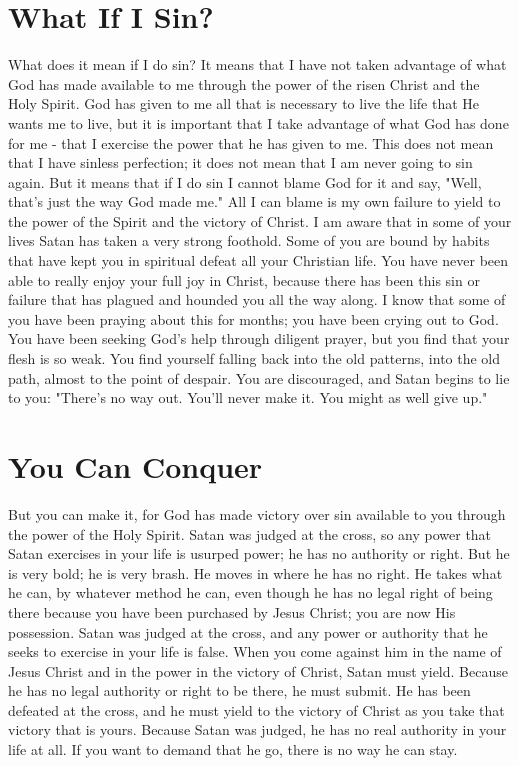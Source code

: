 \section*{What If I Sin?}

What does it mean if I do sin? It means that I have not taken advantage of what God has made available to me through the power of the risen Christ and the Holy Spirit. God has given to me all that is necessary to live the life that He wants me to live, but it is important that I take advantage of what God has done for me - that I exercise the power that he has given to me. This does not mean that I have sinless perfection; it does not mean that I am never going to sin again. But it means that if I do sin I cannot blame God for it and say, "Well, that's just the way God made me." All I can blame is my own failure to yield to the power of the Spirit and the victory of Christ. I am aware that in some of your lives Satan has taken a very strong foothold. Some of you are bound by habits that have kept you in spiritual defeat all your Christian life. You have never been able to really enjoy your full joy in Christ, because there has been this sin or failure that has plagued and hounded you all the way along. I know that some of you have been praying about this for months; you have been crying out to God. You have been seeking God's help through diligent prayer, but you find that your flesh is so weak. You find yourself falling back into the old patterns, into the old path, almost to the point of despair. You are discouraged, and Satan begins to lie to you: "There's no way out. You'll never make it. You might as well give up." 

\section*{You Can Conquer}

But you can make it, for God has made victory over sin available to you through the power of the Holy Spirit. Satan was judged at the cross, so any power that Satan exercises in your life is usurped power; he has no authority or right. But he is very bold; he is very brash. He moves in where he has no right. He takes what he can, by whatever method he can, even though he has no legal right of being there because you have been purchased by Jesus Christ; you are now His possession. Satan was judged at the cross, and any power or authority that he seeks to exercise in your life is false. When you come against him in the name of Jesus Christ and in the power in the victory of Christ, Satan must yield. Because he has no legal authority or right to be there, he must submit. He has been defeated at the cross, and he must yield to the victory of Christ as you take that victory that is yours. Because Satan was judged, he has no real authority in your life at all. If you want to demand that he go, there is no way he can stay. 

